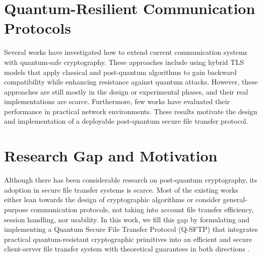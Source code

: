 \section{Quantum-Resilient Communication Protocols}

Several works have investigated how to extend current communication systems with quantum-safe cryptography. These approaches include using hybrid TLS models that apply classical and post-quantum algorithms to gain backward compatibility while enhancing resistance against quantum attacks. However, these approaches are still mostly in the design or experimental phases, and their real implementations are scarce. Furthermore, few works have evaluated their performance in practical network environments. These results motivate the design and implementation of a deployable post-quantum secure file transfer protocol.

\section{Research Gap and Motivation}

Although there has been considerable research on post-quantum cryptography, its adoption in secure file transfer systems is scarce. Most of the existing works either lean towards the design of cryptographic algorithms or consider general-purpose communication protocols, not taking into account file transfer efficiency, session handling, nor usability. In this work, we fill this gap by formulating and implementing a Quantum Secure File Transfer Protocol (Q-SFTP) that integrates practical quantum-resistant cryptographic primitives into an efficient and secure client-server file transfer system with theoretical guarantees in both directions \cite{sola2025quantumftp, baseri2024navigating}.
